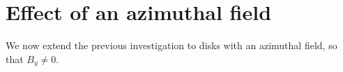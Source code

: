 \section{Effect of an azimuthal field}
We now extend the previous investigation to disks with an azimuthal
field, so that $B_y\neq 0$. 


